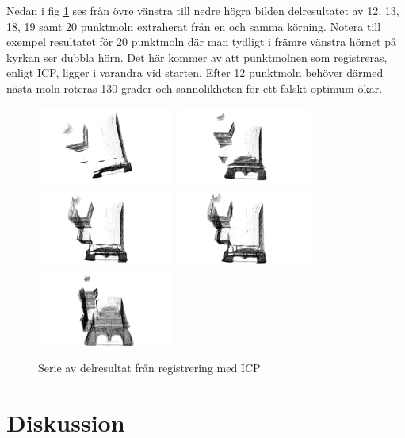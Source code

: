 Nedan i fig \ref{fig:registrered_church_serie} ses från övre vänstra till nedre högra bilden delresultatet av 12, 13, 18, 19 samt 20 punktmoln extraherat från en och samma körning. Notera till exempel resultatet för 20 punktmoln där man tydligt i främre vänstra hörnet på kyrkan ser dubbla hörn. Det här kommer av att punktmolnen som registreras, enligt ICP, ligger i varandra vid starten. Efter 12 punktmoln behöver därmed nästa moln roteras 130 grader och sannolikheten för ett falskt optimum ökar.
\begin{figure}[H]
	\centering
	\includegraphics[width=45mm]{figures/12_pc.png}
	\includegraphics[width=45mm]{figures/13_pc.png}
	\includegraphics[width=45mm]{figures/18_pc.png}
	\includegraphics[width=45mm]{figures/19_pc.png}
	\includegraphics[width=45mm]{figures/20_pc.png}
	\caption{Serie av delresultat från registrering med ICP}
	\label{fig:registrered_church_serie}
\end{figure}

\section{Diskussion}
\label{sec:discussion-karlsson}

